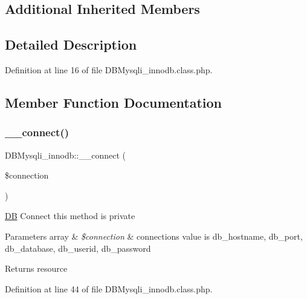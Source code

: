 \subsection*{Additional Inherited Members}


\subsection{Detailed Description}


Definition at line 16 of file D\+B\+Mysqli\+\_\+innodb.\+class.\+php.



\subsection{Member Function Documentation}
\hypertarget{classDBMysqli__innodb_ab6db4cf73da0e11ed0045a07d751e334}{}\label{classDBMysqli__innodb_ab6db4cf73da0e11ed0045a07d751e334} 
\subsubsection{\texorpdfstring{\+\_\+\+\_\+connect()}{\_\_connect()}}
{\footnotesize\ttfamily D\+B\+Mysqli\+\_\+innodb\+::\+\_\+\+\_\+connect (\begin{DoxyParamCaption}\item[{}]{\$connection }\end{DoxyParamCaption})}

\hyperlink{classDB}{DB} Connect this method is private 
\begin{DoxyParams}[1]{Parameters}
array & {\em \$connection} & connection\textquotesingle{}s value is db\+\_\+hostname, db\+\_\+port, db\+\_\+database, db\+\_\+userid, db\+\_\+password \\
\hline
\end{DoxyParams}
\begin{DoxyReturn}{Returns}
resource 
\end{DoxyReturn}


Definition at line 44 of file D\+B\+Mysqli\+\_\+innodb.\+class.\+php.

\hypertarget{classDBMysqli__innodb_a02098642ca57c84b9061172e8a3b8d17}{}\label{classDBMysqli__innodb_a02098642ca57c84b9061172e8a3b8d17} 
